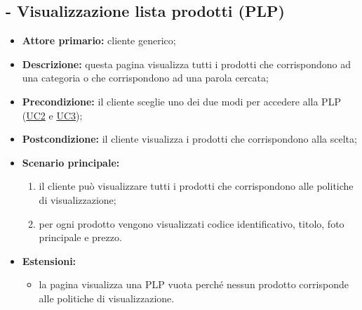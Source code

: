 \stepUserCase
\subsection{ - Visualizzazione lista prodotti (PLP)}
\begin{itemize}
    \item \textbf{Attore primario:} cliente generico;
    \item \textbf{Descrizione:} questa pagina visualizza tutti i prodotti che corrispondono ad una categoria o che corrispondono ad una parola cercata;
    \item \textbf{Precondizione:} il cliente sceglie uno dei due modi per accedere alla PLP (\hyperref[UC2]{UC2} e \hyperref[UC3]{UC3});
    \item \textbf{Postcondizione:} il cliente visualizza i prodotti che corrispondono alla scelta;
    \item \textbf{Scenario principale:}
          \begin{enumerate}
              \item il cliente può visualizzare tutti i prodotti che corrispondono alle politiche di visualizzazione;
              \item per ogni prodotto vengono visualizzati codice identificativo, titolo, foto principale e prezzo.
          \end{enumerate}
    \item \textbf{Estensioni:}
          \begin{itemize}
              \item la pagina visualizza una PLP vuota perché nessun prodotto corrisponde alle politiche di visualizzazione.
          \end{itemize}
\end{itemize}

\stepUserCase
